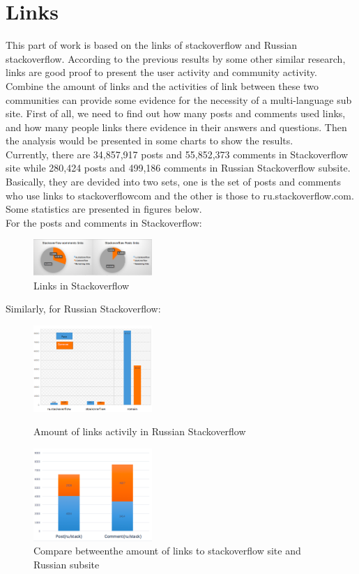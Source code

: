 \documentclass[A4paper,twoside,twocolumn]{article}
\begin{document}
\section{Links}
This part of work is based on the links of stackoverflow and Russian stackoverflow. According to the previous results by some other similar research, links are good proof to present the user activity and community activity. Combine the amount of links and the activities of link between these two communities can provide some evidence for the necessity of a multi-language sub site. First of all, we need to find out how many posts and comments used links, and how many people links there evidence in their answers and questions. Then the analysis would be presented in some charts to show the results. 
\\Currently, there are 34,857,917 posts and 55,852,373 comments in Stackoverflow site while 280,424 posts and 499,186 comments in Russian Stackoverflow subsite. Basically, they are devided into two sets, one is the set of posts and comments who use links to stackoverflowcom and the other is those to ru.stackoverflow.com. Some statistics are presented in figures below.
\\For the posts and comments in Stackoverflow:
	\begin{figure}[H]
		\includegraphics[width = 0.4\textwidth]{link3.png}
		\caption{Links in Stackoverflow}
  	\end{figure}
Similarly, for Russian Stackoverflow:
	\begin{figure}[H]
		\includegraphics[width = 0.4\textwidth]{link1.png}
		\caption{Amount of links activily in Russian Stackoverflow}
		\includegraphics[width = 0.4\textwidth]{link2.png}
		\caption{Compare betweenthe amount of links to stackoverflow site and Russian subsite}
  	\end{figure}
\end{document}
